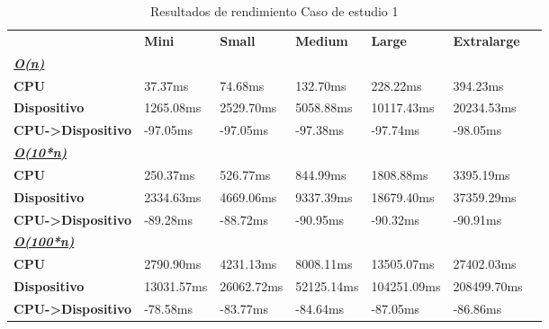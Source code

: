 \begin{table}[H]
    \centering
    \begin{tabular}{lllllll}
    \rowcolor[HTML]{DAE8FC} \ &  \textbf{Mini} &  \textbf{Small} &  \textbf{Medium} &  \textbf{	Large} &  \textbf{	Extralarge} \\
    \cellcolor[HTML]{DAE8FC} \textbf{\textbf{{\emph{{\underline{{O(n)}}}}}}} &  &  &  & 	 & 	 \\
    \rowcolor[HTML]{EFEFEF} \cellcolor[HTML]{DAE8FC} \textbf{CPU} & 37.37ms & 74.68ms & 132.70ms & 	228.22ms & 	394.23ms \\
    \cellcolor[HTML]{DAE8FC} \textbf{Dispositivo} & 1265.08ms & 2529.70ms & 5058.88ms & 	10117.43ms & 	20234.53ms \\
    \rowcolor[HTML]{EFEFEF} \cellcolor[HTML]{DAE8FC} \textbf{CPU->Dispositivo} & -97.05ms & -97.05ms & -97.38ms & 	-97.74ms & 	-98.05ms \\
    \cellcolor[HTML]{DAE8FC} \textbf{\textbf{{\emph{{\underline{{O(10*n)}}}}}}} &  &  &  & 	 & 	 \\
    \rowcolor[HTML]{EFEFEF} \cellcolor[HTML]{DAE8FC} \textbf{CPU} & 250.37ms & 526.77ms & 844.99ms & 	1808.88ms & 	3395.19ms \\
    \cellcolor[HTML]{DAE8FC} \textbf{Dispositivo} & 2334.63ms & 4669.06ms & 9337.39ms & 	18679.40ms & 	37359.29ms \\
    \rowcolor[HTML]{EFEFEF} \cellcolor[HTML]{DAE8FC} \textbf{CPU->Dispositivo} & -89.28ms & -88.72ms & -90.95ms & 	-90.32ms & 	-90.91ms \\
    \cellcolor[HTML]{DAE8FC} \textbf{\textbf{{\emph{{\underline{{O(100*n)}}}}}}} &  &  &  & 	 & 	 \\
    \rowcolor[HTML]{EFEFEF} \cellcolor[HTML]{DAE8FC} \textbf{CPU} & 2790.90ms & 4231.13ms & 8008.11ms & 	13505.07ms & 	27402.03ms \\
    \cellcolor[HTML]{DAE8FC} \textbf{Dispositivo} & 13031.57ms & 26062.72ms & 52125.14ms & 	104251.09ms & 	208499.70ms \\
    \rowcolor[HTML]{EFEFEF} \cellcolor[HTML]{DAE8FC} \textbf{CPU->Dispositivo} & -78.58ms & -83.77ms & -84.64ms & 	-87.05ms & 	-86.86ms \\
    \end{tabular}
    \caption[Resultados de rendimiento Caso de estudio 1]{Resultados de rendimiento Caso de estudio 1}
    \label{table_global_studyCase1_PerformanceResults}
\end{table}